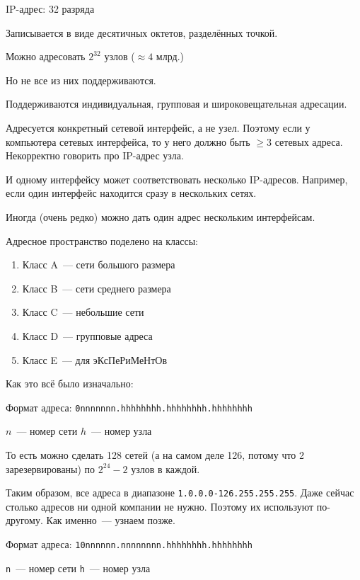 
IP-адрес: 32 разряда

Записывается в виде десятичных октетов, разделённых точкой.

Можно адресовать $2^{32}$ узлов ($\approx 4\text{ млрд.}$)

Но не все из них поддерживаются.

Поддерживаются индивидуальная, групповая и широковещательная адресации.

Адресуется конкретный сетевой интерфейс, а не узел. Поэтому если у компьютера  сетевых интерфейса, то у него должно быть $\ge 3$ сетевых адреса. Некорректно говорить про IP-адрес узла.

И одному интерфейсу может соответствовать несколько IP-адресов. Например, если один интерфейс находится сразу в нескольких сетях.

Иногда (очень редко) можно дать один адрес нескольким интерфейсам.

Адресное пространство поделено на классы:

\begin{enumerate}
    \item Класс A~--- сети большого размера
    \item Класс B~--- сети среднего размера
    \item Класс C~--- небольшие сети
    \item Класс D~--- групповые адреса
    \item Класс E~--- для эКсПеРиМеНтОв
\end{enumerate}

Как это всё было изначально:


Формат адреса: {\tt 0nnnnnnn.hhhhhhhh.hhhhhhhh.hhhhhhhh}

$n$~--- номер сети
$h$~--- номер узла

То есть можно сделать 128 сетей (а на самом деле 126, потому что 2 зарезервированы) по $2^{24}-2$ узлов в каждой.

Таким образом, все адреса в диапазоне {\tt 1.0.0.0-126.255.255.255}. Даже сейчас столько адресов ни одной компании не нужно. Поэтому их используют по-другому. Как именно~--- узнаем позже.


Формат адреса: {\tt 10nnnnnn.nnnnnnnn.hhhhhhhh.hhhhhhhh}

{\tt n}~--- номер сети
{\tt h}~--- номер узла

